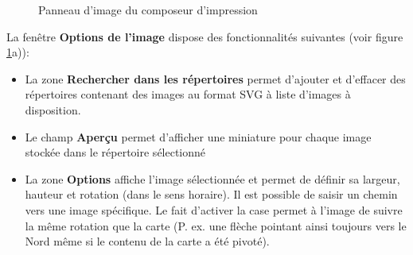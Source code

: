 \begin{figure}[ht]
\centering
     \hspace{1cm}
   \caption{Panneau d'image du composeur d'impression \nixcaption} \label{fig:imageoptions}
\end{figure}



La fenêtre \textbf{Options de l'image} dispose des fonctionnalités suivantes (voir figure \ref{fig:imageoptions}a)):

\begin{itemize}[label=--]
\item La zone \textbf{Rechercher dans les répertoires} permet d'ajouter et d'effacer des répertoires contenant des images au format SVG à liste d'images à disposition.
\item Le champ \textbf{Aperçu} permet d'afficher une miniature pour chaque image stockée dans le répertoire sélectionné
\item La zone \textbf{Options} affiche l'image sélectionnée et permet de définir sa largeur, hauteur et rotation (dans le sens horaire). Il est possible de saisir un chemin vers une image spécifique. Le fait d'activer la case  permet à l'image de suivre la même rotation que la carte (P. ex. une flèche pointant ainsi toujours vers le Nord même si le contenu de la carte a été pivoté).
\end{itemize}

